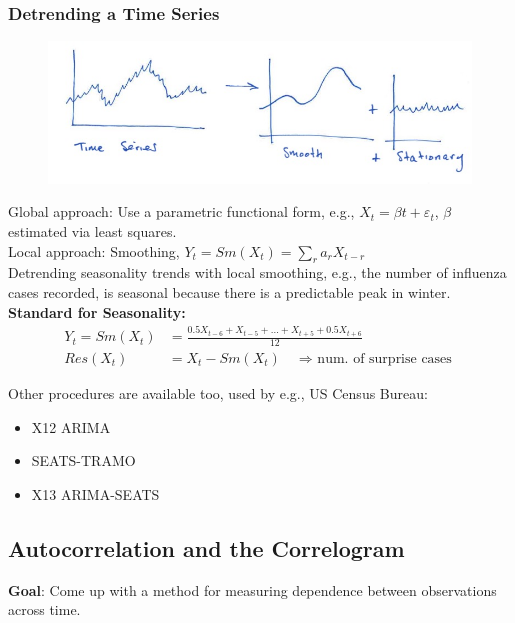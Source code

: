 \subsubsection{Detrending a Time Series}

\begin{figure}[H]
\includegraphics[scale=0.4]{images/Screenshot 2024-03-30 at 15.07.16.jpg}
\centering
\end{figure}

Global approach: Use a parametric functional form, e.g., $X_t=\beta t+\varepsilon_t$, $\beta$ estimated via least squares. \\

Local approach: Smoothing, $Y_t=Sm(X_t)=\sum_r a_r X_{t-r}$ \\

Detrending seasonality trends with local smoothing, e.g., the number of influenza cases recorded, is seasonal because there is a predictable peak in winter.\\

\textbf{Standard for Seasonality:}
\begin{align*}
    Y_t=Sm(X_t)&=\frac{0.5 X_{t-6} + X_{t-5}+...+X_{t+5} + 0.5 X_{t+6}}{12}\\
    Res(X_t)&=X_t-Sm(X_t) \quad \text{$\Rightarrow$ num. of surprise cases}
\end{align*}

Other procedures are available too, used by e.g., US Census Bureau:
\begin{itemize}
    \item X12 ARIMA
    \item SEATS-TRAMO
    \item X13 ARIMA-SEATS
\end{itemize}

\subsection{Autocorrelation and the Correlogram}

\textbf{Goal}: Come up with a method for measuring dependence between observations across time.\\

